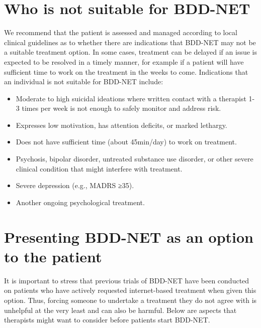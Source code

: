 \documentclass[]{book}
\providecommand{\tightlist}{%
  \setlength{\itemsep}{0pt}\setlength{\parskip}{0pt}}
\begin{document}
\hypertarget{who-is-not-suitable-for-bdd-net}{%
\section{Who is not suitable for BDD-NET}\label{who-is-not-suitable-for-bdd-net}}

We recommend that the patient is assessed and managed according to local clinical guidelines as to whether there are indications that BDD-NET may not be a suitable treatment option. In some cases, treatment can be delayed if an issue is expected to be resolved in a timely manner, for example if a patient will have sufficient time to work on the treatment in the weeks to come. Indications that an individual is not suitable for BDD-NET include:

\begin{itemize}
\tightlist
\item
  Moderate to high suicidal ideations where written contact with a therapist 1-3 times per week is not enough to safely monitor and address risk.\\
\item
  Expresses low motivation, has attention deficits, or marked lethargy.\\
\item
  Does not have sufficient time (about 45min/day) to work on treatment.\\
\item
  Psychosis, bipolar disorder, untreated substance use disorder, or other severe clinical condition that might interfere with treatment.\\
\item
  Severe depression (e.g., MADRS ≥35).\\
\item
  Another ongoing psychological treatment.
\end{itemize}

\hypertarget{presenting-bdd-net-as-an-option-to-the-patient}{%
\section{Presenting BDD-NET as an option to the patient}\label{presenting-bdd-net-as-an-option-to-the-patient}}

It is important to stress that previous trials of BDD-NET have been conducted on patients who have actively requested internet-based treatment when given this option. Thus, forcing someone to undertake a treatment they do not agree with is unhelpful at the very least and can also be harmful. Below are aspects that therapists might want to consider before patients start BDD-NET.
\end{document}
